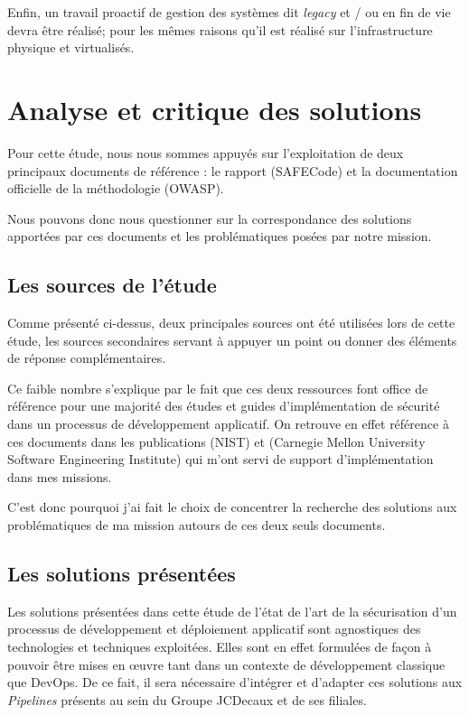Enfin, un travail proactif de gestion des systèmes dit \emph{legacy} et / ou en fin de vie devra être réalisé; pour les
mêmes raisons qu'il est réalisé sur l'infrastructure physique et virtualisés.

\newpage

\section{Analyse et critique des solutions}

Pour cette étude, nous nous sommes appuyés sur l'exploitation de deux principaux documents de référence : le rapport 
 (SAFECode) et la documentation officielle de la méthodologie 
 (\ac{OWASP}). 

Nous pouvons donc nous questionner sur la correspondance des solutions apportées par ces documents et les 
problématiques posées par notre mission.

\subsection{Les sources de l'étude}
Comme présenté ci-dessus, deux principales sources ont été utilisées lors de cette étude, les sources secondaires servant
à appuyer un point ou donner des éléments de réponse complémentaires.

Ce faible nombre s'explique par le fait que ces deux ressources font office de référence pour une majorité des études et 
guides d'implémentation de sécurité dans un processus de développement applicatif. On retrouve en effet référence à ces
documents dans les publications  (\ac{NIST}) et 
(Carnegie Mellon University Software Engineering Institute) qui m'ont servi de support d'implémentation dans mes missions.

C'est donc  pourquoi j'ai fait le choix de concentrer la recherche des solutions aux problématiques de ma mission autours
de ces deux seuls documents.

\subsection{Les solutions présentées}
Les solutions présentées dans cette étude de l'état de l'art de la sécurisation d'un processus de développement et 
déploiement applicatif sont agnostiques des technologies et techniques exploitées. Elles sont en effet formulées de façon à
pouvoir être mises en œuvre tant dans un contexte de développement classique que DevOps.
\newline De ce fait, il sera nécessaire d'intégrer et d'adapter ces solutions aux \emph{Pipelines} présents au sein 
du Groupe JCDecaux et de ses filiales.

